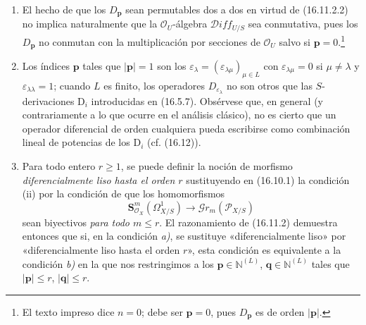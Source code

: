 \begin{remarks}[16.11.3]
\label{IV.16.11.3}
\begin{enumerate}
  \item[(i)] El hecho de que los $D_{\mathbf{p}}$ sean permutables dos a dos en
  virtud de (16.11.2.2) no implica naturalmente que la
  $\mathcal{O}_U$-álgebra $\mathscr D\!iff_{U/S}$ sea conmutativa, pues los
  $D_{\mathbf{p}}$ no conmutan con la multiplicación por secciones de
  $\mathcal{O}_U$ salvo si $\mathbf{p}=0$.\footnote{El texto impreso dice
  $n=0$; debe ser $\mathbf{p}=0$, pues $D_{\mathbf{p}}$ es de orden
  $|\mathbf{p}|$.}
  \item[(ii)] Los índices $\mathbf{p}$ tales que $|\mathbf{p}|=1$ son los
  $\varepsilon_\lambda
  =(\varepsilon_{\lambda\mu})_{\mu\in L}$ con
  $\varepsilon_{\lambda\mu}=0$ si $\mu\neq\lambda$ y
  $\varepsilon_{\lambda\lambda}=1$; cuando $L$ es finito, los operadores
  $D_{\varepsilon_\lambda}$ no son otros que las
  $S$-derivaciones $\mathrm D_i$ introducidas en (16.5.7). Obsérvese que, en general
  (y contrariamente a lo que ocurre en el análisis clásico), no es cierto que
  un operador diferencial de orden cualquiera pueda escribirse como combinación
  lineal de potencias de los $\mathrm D_i$ (cf. (16.12)).
  \item[(iii)] Para todo entero $r\geq1$, se puede definir la noción de
  morfismo \emph{diferencialmente liso hasta el orden $r$} sustituyendo
  en (16.10.1) la condición (ii) por la condición de que los homomorfismos
  \[
    \mathbf{S}_{\mathcal{O}_X}^m(\varOmega_{X/S}^1)
    \longrightarrow\mathscr{G}r_m(\mathscr{P}_{X/S})
  \]
  sean biyectivos \emph{para todo $m\leq r$}. El razonamiento de (16.11.2)
  demuestra entonces que si, en la condición \emph{a)}, se sustituye «diferencialmente
  liso» por «diferencialmente liso hasta el orden $r$», esta condición es
  equivalente a la condición \emph{b)} en la que nos restringimos a los
  $\mathbf{p}\in\mathbb{N}^{(L)}$, $\mathbf{q}\in\mathbb{N}^{(L)}$ tales que
  $|\mathbf{p}|\leq r$, $|\mathbf{q}|\leq r$.
\end{enumerate}
\end{remarks}
